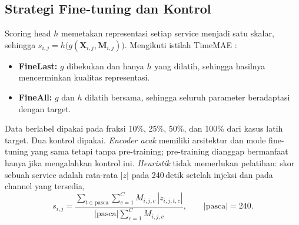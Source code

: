 \subsection{Strategi Fine-tuning dan Kontrol}
Scoring head $h$ memetakan representasi setiap service menjadi satu skalar, sehingga $s_{i,j}=h\bigl(g(\mathbf{X}_{i,j},\mathbf{M}_{i,j})\bigr)$.  Mengikuti istilah TimeMAE \cite{cheng2026timemae}:
\begin{itemize}
\item \textbf{FineLast:} $g$ dibekukan dan hanya $h$ yang dilatih, sehingga hasilnya mencerminkan kualitas representasi.
\item \textbf{FineAll:} $g$ dan $h$ dilatih bersama, sehingga seluruh parameter beradaptasi dengan target.
\end{itemize}
Data berlabel dipakai pada fraksi 10\%, 25\%, 50\%, dan 100\% dari kasus latih target.  Dua kontrol dipakai. \emph{Encoder acak} memiliki arsitektur dan mode fine-tuning yang sama tetapi tanpa pre-training; pre-training dianggap bermanfaat hanya jika mengalahkan kontrol ini. \emph{Heuristik} tidak memerlukan pelatihan: skor sebuah service adalah rata-rata $|z|$ pada 240\,detik setelah injeksi dan pada channel yang tersedia,
\begin{equation}
s_{i,j}=\frac{\sum_{t\in\text{pasca}}\sum_{c=1}^{C}M_{i,j,c}\,|z_{i,j,t,c}|}{|\text{pasca}|\sum_{c=1}^{C}M_{i,j,c}},\qquad |\text{pasca}|=240 .
\end{equation}

